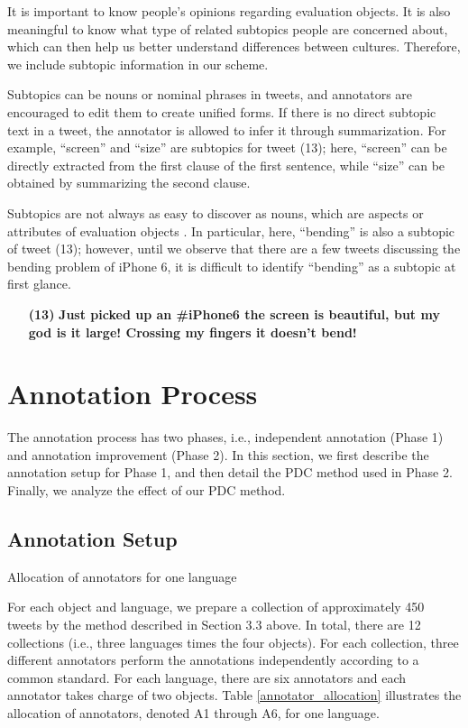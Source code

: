 \documentclass[english]{jnlp_1.4}
\begin{document}
It is important to know people's opinions regarding evaluation objects. It is also meaningful to know what type of related subtopics people are concerned about, which can then help us better understand differences between cultures. Therefore, we include subtopic information in our scheme.

Subtopics can be nouns or nominal phrases in tweets, and annotators are encouraged to edit them to create unified forms. If there is no direct subtopic text in a tweet, the annotator is allowed to infer it through summarization. For example, ``screen'' and ``size'' are subtopics for tweet (13); here, ``screen'' can be directly extracted from the first clause of the first sentence, while ``size'' can be obtained by summarizing the second clause.

Subtopics are not always as easy to discover as nouns, which are aspects or attributes of evaluation objects \cite{Hovy15}. In particular, here, ``bending'' is also a subtopic of tweet (13); however, until we observe that there are a few tweets discussing the bending problem of iPhone 6, it is difficult to identify ``bending'' as a subtopic at first glance.
\begin{enumerate}
\item[{\bf (13)}] {\bf Just picked up an \#iPhone6 the screen is beautiful, but my god is it large! Crossing my fingers it doesn't bend!}
\end{enumerate}


\section{Annotation Process}

The annotation process has two phases, i.e., independent annotation (Phase 1) and annotation improvement (Phase 2). In this section, we first describe the annotation setup for Phase 1, and then detail the PDC method used in Phase 2. Finally, we analyze the effect of our PDC method.


\subsection{Annotation Setup}

\begin{table}[b]
\renewcommand{\arraystretch}{}
\caption{Allocation of annotators for one language}
\label{annotator_allocation}

\end{table}

For each object and language, we prepare a collection of approximately 450 tweets by the method described in Section 3.3 above. In total, there are 12 collections (i.e., three languages times the four objects). For each collection, three different annotators perform the annotations independently according to a common standard. For each language, there are six annotators and each annotator takes charge of two objects. Table \ref{annotator_allocation} illustrates the allocation of annotators, denoted A1 through A6, for one language.
\end{document}
